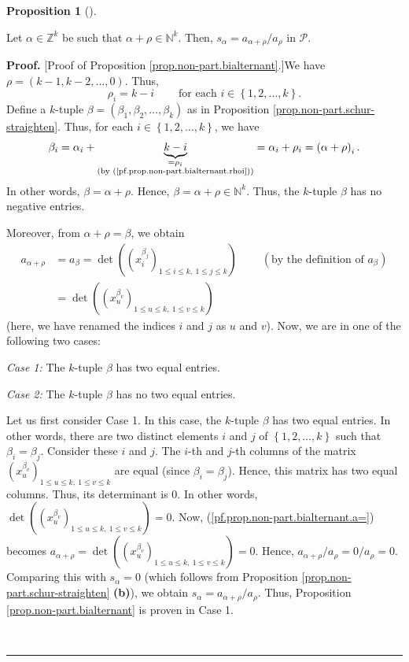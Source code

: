 \documentclass[numbers=enddot,12pt,final,onecolumn,notitlepage]{scrartcl}%
\theoremstyle{definition}
\newtheorem{prop}[theo]{Proposition}
\newenvironment{proposition}[1][]
{\begin{prop}[#1]\begin{leftbar}}
{\end{leftbar}\end{prop}}
\newenvironment{proof}[1][Proof]{\noindent\textbf{#1.} }{\ \rule{0.5em}{0.5em}}
\begin{document}
\begin{proposition}
\label{prop.non-part.bialternant}Let $\alpha\in\mathbb{Z}^{k}$ be such that
$\alpha+\rho\in\mathbb{N}^{k}$. Then, $s_{\alpha}=a_{\alpha+\rho}/a_{\rho}$ in
$\mathcal{P}$.
\end{proposition}

\begin{proof}
[Proof of Proposition \ref{prop.non-part.bialternant}.]We have $\rho=\left(
k-1,k-2,\ldots,0\right)  $. Thus,%
\begin{equation}
\rho_{i}=k-i\ \ \ \ \ \ \ \ \ \ \text{for each }i\in\left\{  1,2,\ldots
,k\right\}  . \label{pf.prop.non-part.bialternant.rhoi}%
\end{equation}
Define a $k$-tuple $\beta=\left(  \beta_{1},\beta_{2},\ldots,\beta_{k}\right)
$ as in Proposition \ref{prop.non-part.schur-straighten}. Thus, for each
$i\in\left\{  1,2,\ldots,k\right\}  $, we have%
\[
\beta_{i}=\alpha_{i}+\underbrace{k-i}_{\substack{=\rho_{i}\\\text{(by
(\ref{pf.prop.non-part.bialternant.rhoi}))}}}=\alpha_{i}+\rho_{i}=\left(
\alpha+\rho\right)  _{i}.
\]
In other words, $\beta=\alpha+\rho$. Hence, $\beta=\alpha+\rho\in
\mathbb{N}^{k}$. Thus, the $k$-tuple $\beta$ has no negative entries.

Moreover, from $\alpha+\rho=\beta$, we obtain%
\begin{align}
a_{\alpha+\rho}  &  =a_{\beta}=\det\left(  \left(  x_{i}^{\beta_{j}}\right)
_{1\leq i\leq k,\ 1\leq j\leq k}\right)  \ \ \ \ \ \ \ \ \ \ \left(  \text{by
the definition of }a_{\beta}\right) \nonumber\\
&  =\det\left(  \left(  x_{u}^{\beta_{v}}\right)  _{1\leq u\leq k,\ 1\leq
v\leq k}\right)  \label{pf.prop.non-part.bialternant.a=}%
\end{align}
(here, we have renamed the indices $i$ and $j$ as $u$ and $v$). Now, we are in
one of the following two cases:

\textit{Case 1:} The $k$-tuple $\beta$ has two equal entries.

\textit{Case 2:} The $k$-tuple $\beta$ has no two equal entries.

Let us first consider Case 1. In this case, the $k$-tuple $\beta$ has two
equal entries. In other words, there are two distinct elements $i$ and $j$ of
$\left\{  1,2,\ldots,k\right\}  $ such that $\beta_{i}=\beta_{j}$. Consider
these $i$ and $j$. The $i$-th and $j$-th columns of the matrix $\left(
x_{u}^{\beta_{v}}\right)  _{1\leq u\leq k,\ 1\leq v\leq k}$ are equal (since
$\beta_{i}=\beta_{j}$). Hence, this matrix has two equal columns. Thus, its
determinant is $0$. In other words, $\det\left(  \left(  x_{u}^{\beta_{v}%
}\right)  _{1\leq u\leq k,\ 1\leq v\leq k}\right)  =0$. Now,
(\ref{pf.prop.non-part.bialternant.a=}) becomes $a_{\alpha+\rho}=\det\left(
\left(  x_{u}^{\beta_{v}}\right)  _{1\leq u\leq k,\ 1\leq v\leq k}\right)
=0$. Hence, $a_{\alpha+\rho}/a_{\rho}=0/a_{\rho}=0$. Comparing this with
$s_{\alpha}=0$ (which follows from Proposition
\ref{prop.non-part.schur-straighten} \textbf{(b)}), we obtain $s_{\alpha
}=a_{\alpha+\rho}/a_{\rho}$. Thus, Proposition \ref{prop.non-part.bialternant}
is proven in Case 1.


\end{proof}
\end{document}
